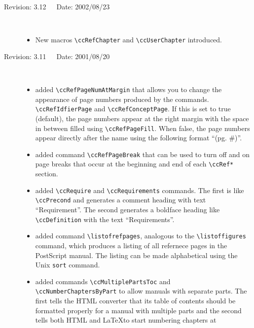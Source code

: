\documentclass[11pt]{article}
\begin{document}
\begin{description}
    \item[Revision: 3.12~~~Date: 2002/08/23]~\\[-3mm]
    \begin{itemize}
       \item New macros \verb|\ccRefChapter| and \verb|\ccUserChapter| introduced. 
          \end{itemize}
    \item[Revision: 3.11~~~Date: 2001/08/20]~\\[-3mm]
    \begin{itemize}
       \item added \verb|\ccRefPageNumAtMargin| that allows you to change the
             appearance of page numbers produced by the commands.
             \verb|\ccRefIdfierPage| and \verb|\ccRefConceptPage|.
             If this is set to true (default), the page numbers appear at the
             right margin with the space in between filled using
             \verb+\ccRefPageFill+.  When false, the page numbers appear
             directly after the name using the following format ``(pg. \#)''.
       \item added command \verb|\ccRefPageBreak| that can be used to turn off
             and on page breaks that occur at the beginning and end of each
             \verb|\ccRef*| section.
       \item added \verb|\ccRequire| and \verb|\ccRequirements| commands.
             The first is like \verb|\ccPrecond| and generates a comment
             heading with text ``Requirement''. The second generates a
             boldface heading like \verb|\ccDefinition| with the text
             ``Requirements''.
       \item added command \verb|\listofrefpages|, analogous to the
             \verb|\listoffigures| command, which produces a listing of
             all refernece pages in the PostScript manual.  The listing
             can be made alphabetical using the Unix \verb|sort| command.
       \item added commands \verb|\ccMultiplePartsToc| and 
             \verb|\ccNumberChaptersByPart|
             to allow manuals with separate parts.  The first tells the
             HTML converter that its table of contents should be formatted
             properly for a manual with multiple parts and the second
             tells both HTML and \LaTeX to start numbering chapters at

\end{itemize}
\end{description}
\end{document}
